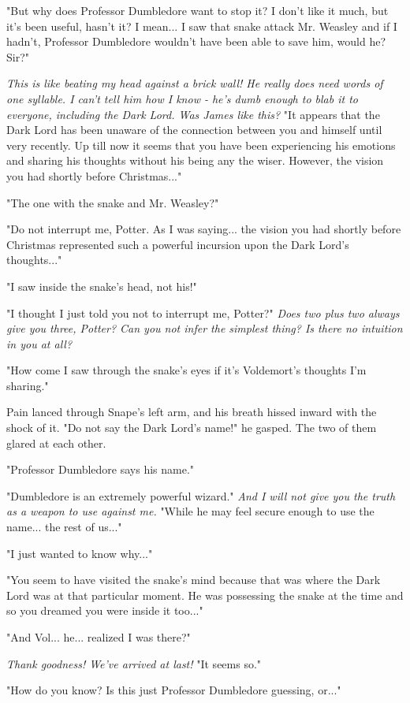\documentclass[a4paper,11pt]{article}
\begin{document}
"But why does Professor Dumbledore want to stop it? I don't like it much, but it's been useful, hasn't it? I mean... I saw that snake attack Mr. Weasley and if I hadn't, Professor Dumbledore wouldn't have been able to save him, would he? Sir?"

\emph{This is like beating my head against a brick wall! He really does need words of one syllable. I can't tell him how I know - he's dumb enough to blab it to everyone, including the Dark Lord. Was James like this?} "It appears that the Dark Lord has been unaware of the connection between you and himself until very recently. Up till now it seems that you have been experiencing his emotions and sharing his thoughts without his being any the wiser. However, the vision you had shortly before Christmas..."

"The one with the snake and Mr. Weasley?"

"Do not interrupt me, Potter. As I was saying... the vision you had shortly before Christmas represented such a powerful incursion upon the Dark Lord's thoughts..."

"I saw inside the snake's head, not his!"

"I thought I just told you not to interrupt me, Potter?" \emph{Does two plus two always give you three, Potter? Can you not infer the simplest thing? Is there no intuition in you at all?}

"How come I saw through the snake's eyes if it's Voldemort's thoughts I'm sharing."

Pain lanced through Snape's left arm, and his breath hissed inward with the shock of it. "Do not say the Dark Lord's name!" he gasped. The two of them glared at each other.

"Professor Dumbledore says his name."

"Dumbledore is an extremely powerful wizard." \emph{And I will not give you the truth as a weapon to use against me.} "While he may feel secure enough to use the name... the rest of us..."

"I just wanted to know why..."

"You seem to have visited the snake's mind because that was where the Dark Lord was at that particular moment. He was possessing the snake at the time and so you dreamed you were inside it too..."

"And Vol... he... realized I was there?"

\emph{Thank goodness! We've arrived at last!} "It seems so."

"How do you know? Is this just Professor Dumbledore guessing, or..."
\end{document}
